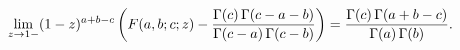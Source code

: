 \[\lim_{z\to 1-}(1-z)^{a+b-c}\left(\mathop{F\/}\nolimits\!\left(a,b;c;z\right)-%
\frac{\mathop{\Gamma\/}\nolimits\!\left(c\right)\mathop{\Gamma\/}\nolimits\!%
\left(c-a-b\right)}{\mathop{\Gamma\/}\nolimits\!\left(c-a\right)\mathop{\Gamma%
\/}\nolimits\!\left(c-b\right)}\right)=\frac{\mathop{\Gamma\/}\nolimits\!\left%
(c\right)\mathop{\Gamma\/}\nolimits\!\left(a+b-c\right)}{\mathop{\Gamma\/}%
\nolimits\!\left(a\right)\mathop{\Gamma\/}\nolimits\!\left(b\right)}.\]